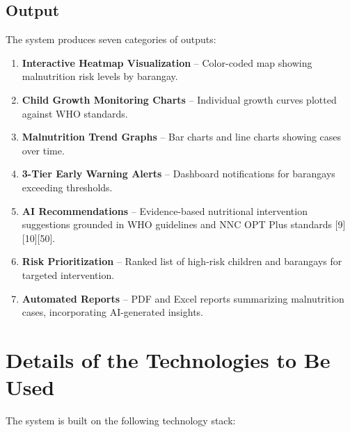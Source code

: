 \documentclass[12pt, a4paper]{report}
\begin{document}
\subsection{Output}
\label{subsec:output}
The system produces seven categories of outputs:
\begin{enumerate}
    \item \textbf{Interactive Heatmap Visualization} -- Color-coded map showing malnutrition risk levels by barangay.
    \item \textbf{Child Growth Monitoring Charts} -- Individual growth curves plotted against WHO standards.
    \item \textbf{Malnutrition Trend Graphs} -- Bar charts and line charts showing cases over time.
    \item \textbf{3-Tier Early Warning Alerts} -- Dashboard notifications for barangays exceeding thresholds.
    \item \textbf{AI Recommendations} -- Evidence-based nutritional intervention suggestions grounded in WHO guidelines and NNC OPT Plus standards [9][10][50].
    \item \textbf{Risk Prioritization} -- Ranked list of high-risk children and barangays for targeted intervention.
    \item \textbf{Automated Reports} -- PDF and Excel reports summarizing malnutrition cases, incorporating AI-generated insights.
\end{enumerate}

\section{Details of the Technologies to Be Used}
\label{sec:technologies}
The system is built on the following technology stack:
\end{document}
